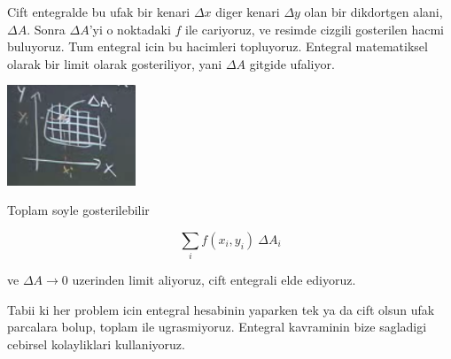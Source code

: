\documentclass[12pt,fleqn]{article}
\begin{document}
Cift entegralde bu ufak bir kenari $\Delta x$ diger kenari $\Delta y$ olan
bir dikdortgen alani, $\Delta A$. Sonra $\Delta A$'yi o noktadaki $f$ ile
cariyoruz, ve resimde cizgili gosterilen hacmi buluyoruz. Tum entegral icin
bu hacimleri topluyoruz. Entegral matematiksel olarak bir limit olarak
gosteriliyor, yani $\Delta A$ gitgide ufaliyor. 

\includegraphics[height=3cm]{16_4.png}

Toplam soyle gosterilebilir

\[ \sum_i f(x_i,y_i) \ \Delta A_i \]

ve $\Delta A \to 0$ uzerinden limit aliyoruz, cift entegrali elde ediyoruz. 

Tabii ki her problem icin entegral hesabinin yaparken tek ya da cift olsun
ufak parcalara bolup, toplam ile ugrasmiyoruz. Entegral kavraminin bize
sagladigi cebirsel kolayliklari kullaniyoruz. 
\end{document}
